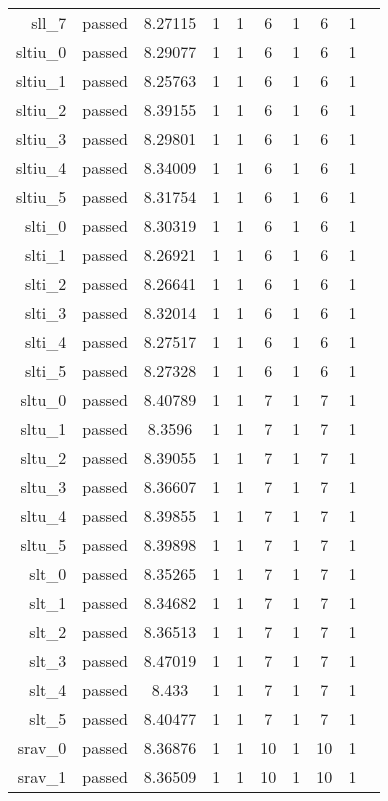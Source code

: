 \begin{longtable}{r|ccccccccc}
    sll\_7 & passed & 8.27115 & 1 & 1 & 6 & 1 & 6 & 1 \\
    sltiu\_0 & passed & 8.29077 & 1 & 1 & 6 & 1 & 6 & 1 \\
    sltiu\_1 & passed & 8.25763 & 1 & 1 & 6 & 1 & 6 & 1 \\
    sltiu\_2 & passed & 8.39155 & 1 & 1 & 6 & 1 & 6 & 1 \\
    sltiu\_3 & passed & 8.29801 & 1 & 1 & 6 & 1 & 6 & 1 \\
    sltiu\_4 & passed & 8.34009 & 1 & 1 & 6 & 1 & 6 & 1 \\
    sltiu\_5 & passed & 8.31754 & 1 & 1 & 6 & 1 & 6 & 1 \\
    slti\_0 & passed & 8.30319 & 1 & 1 & 6 & 1 & 6 & 1 \\
    slti\_1 & passed & 8.26921 & 1 & 1 & 6 & 1 & 6 & 1 \\
    slti\_2 & passed & 8.26641 & 1 & 1 & 6 & 1 & 6 & 1 \\
    slti\_3 & passed & 8.32014 & 1 & 1 & 6 & 1 & 6 & 1 \\
    slti\_4 & passed & 8.27517 & 1 & 1 & 6 & 1 & 6 & 1 \\
    slti\_5 & passed & 8.27328 & 1 & 1 & 6 & 1 & 6 & 1 \\
    sltu\_0 & passed & 8.40789 & 1 & 1 & 7 & 1 & 7 & 1 \\
    sltu\_1 & passed & 8.3596 & 1 & 1 & 7 & 1 & 7 & 1 \\
    sltu\_2 & passed & 8.39055 & 1 & 1 & 7 & 1 & 7 & 1 \\
    sltu\_3 & passed & 8.36607 & 1 & 1 & 7 & 1 & 7 & 1 \\
    sltu\_4 & passed & 8.39855 & 1 & 1 & 7 & 1 & 7 & 1 \\
    sltu\_5 & passed & 8.39898 & 1 & 1 & 7 & 1 & 7 & 1 \\
    slt\_0 & passed & 8.35265 & 1 & 1 & 7 & 1 & 7 & 1 \\
    slt\_1 & passed & 8.34682 & 1 & 1 & 7 & 1 & 7 & 1 \\
    slt\_2 & passed & 8.36513 & 1 & 1 & 7 & 1 & 7 & 1 \\
    slt\_3 & passed & 8.47019 & 1 & 1 & 7 & 1 & 7 & 1 \\
    slt\_4 & passed & 8.433 & 1 & 1 & 7 & 1 & 7 & 1 \\
    slt\_5 & passed & 8.40477 & 1 & 1 & 7 & 1 & 7 & 1 \\
    srav\_0 & passed & 8.36876 & 1 & 1 & 10 & 1 & 10 & 1 \\
    srav\_1 & passed & 8.36509 & 1 & 1 & 10 & 1 & 10 & 1 \\

\end{longtable}
